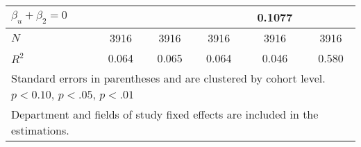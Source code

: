 \begin{table}[ht]
{\begin{tabular}{l*{5}{c}}
         \\
$\beta_u + \beta_2 = 0 $       &                 &                &                 &               0.1077     &              \\
\hline
\(N\)       &        3916         &        3916         &        3916         &        3916         &        3916         \\
\(R^{2}\)   &       0.064         &       0.065         &       0.064         &       0.046         &       0.580         \\
\hline\hline
\multicolumn{6}{l}{\footnotesize Standard errors in parentheses and are clustered by cohort level. \sym{*} \(p<0.10\), \sym{**} \(p<.05\), \sym{***} \(p<.01\)}\\
\multicolumn{6}{l}{\footnotesize Department and fields of study fixed effects are included in the estimations.}\\
\end{tabular}%
}
\end{table}
